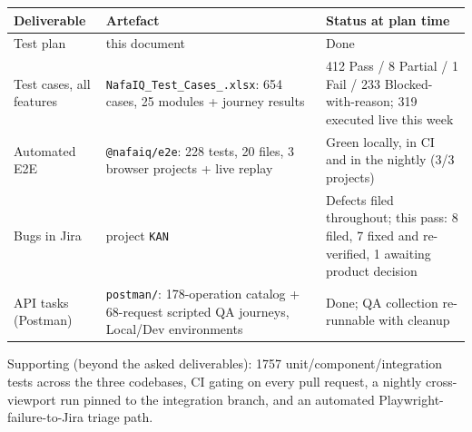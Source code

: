 \documentclass[11pt,a4paper]{article}
\begin{document}
\begin{center}
\small
\begin{tabularx}{\textwidth}{lLL}
\toprule
\textbf{Deliverable} & \textbf{Artefact} & \textbf{Status at plan time} \\
\midrule
Test plan & this document & Done \\
Test cases, all features & \texttt{NafaIQ\_Test\_Cases\_.xlsx}: 654 cases, 25 modules + journey results & 412 Pass / 8 Partial / 1 Fail / 233 Blocked-with-reason; 319 executed live this week \\
Automated E2E & \texttt{@nafaiq/e2e}: 228 tests, 20 files, 3 browser projects + live replay & Green locally, in CI and in the nightly (3/3 projects) \\
Bugs in Jira & project \texttt{KAN} & Defects filed throughout; this pass: 8 filed, 7 fixed and re-verified, 1 awaiting product decision \\
API tasks (Postman) & \texttt{postman/}: 178-operation catalog + 68-request scripted QA journeys, Local/Dev environments & Done; QA collection re-runnable with cleanup \\
\bottomrule
\end{tabularx}
\end{center}

Supporting (beyond the asked deliverables): 1757 unit/component/integration
tests across the three codebases, CI gating on every pull request, a nightly
cross-viewport run pinned to the integration branch, and an automated
Playwright-failure-to-Jira triage path.
\end{document}
